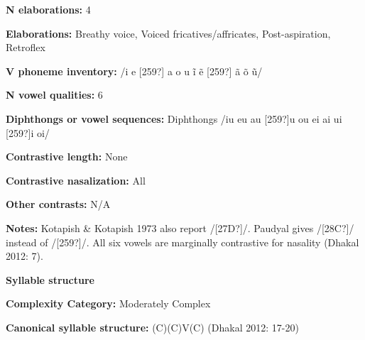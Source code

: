 \begin{styleBody}
\textbf{N elaborations:} 4
\end{styleBody}

\begin{styleBody}
\textbf{Elaborations:} Breathy voice, Voiced fricatives/affricates, Post-aspiration, Retroflex
\end{styleBody}

\begin{styleBody}
\textbf{V phoneme inventory:} /i e [259?] a o u \~{i} \~{e} [259?] \~{a} \~{o} \~{u}/
\end{styleBody}

\begin{styleBody}
\textbf{N vowel qualities:} 6
\end{styleBody}

\begin{styleBody}
\textbf{Diphthongs or vowel sequences:} Diphthongs /iu eu au [259?]u ou ei ai ui [259?]i oi/
\end{styleBody}

\begin{styleBody}
\textbf{Contrastive length:} None
\end{styleBody}

\begin{styleBody}
\textbf{Contrastive nasalization:} All
\end{styleBody}

\begin{styleBody}
\textbf{Other contrasts:} N/A
\end{styleBody}

\begin{styleBody}
\textbf{Notes:} Kotapish \& Kotapish 1973 also report /[27D?]/. Paudyal gives /[28C?]/ instead of /[259?]/. All six vowels are marginally contrastive for nasality (Dhakal 2012: 7).
\end{styleBody}

\begin{styleBody}
\textbf{Syllable structure}
\end{styleBody}

\begin{styleBody}
\textbf{Complexity Category:} Moderately Complex
\end{styleBody}

\begin{styleBody}
\textbf{Canonical syllable structure:} (C)(C)V(C)\textbf{ }(Dhakal 2012: 17-20)
\end{styleBody}

